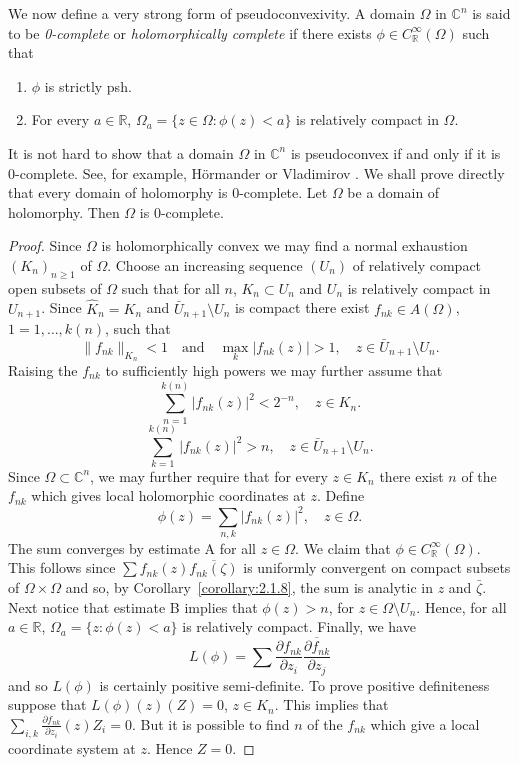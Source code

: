 We now define a very strong form of pseudoconvexivity.
 A domain $\Omega$ in $\mathbb C^n$ is said to be \emph{0-complete} or \emph{holomorphically complete} if there exists $\phi\in C_{\mathbb R}^\infty(\Omega)$ such that
\begin{enumerate}
\item $\phi$ is strictly psh.
\item For every $a\in\mathbb R$, $\Omega_a=\{z\in\Omega:\phi(z)<a\}$ is relatively compact in $\Omega$.
\end{enumerate}
It is not hard to show that a domain $\Omega$ in $\mathbb C^n$ is pseudoconvex if and only if it is 0-complete. See, for example, H\"ormander \cite{bib:I:hormander-l:1} or Vladimirov \cite{bib:I:vladimirov-v-s:1}. We shall prove directly that every domain of holomorphy is 0-complete.
 Let $\Omega$ be a domain of holomorphy. Then $\Omega$ is 0-complete.
\begin{proof}
Since $\Omega$ is holomorphically convex we may find a normal exhaustion $(K_n)_{n\geq1}$ of $\Omega$. Choose an increasing sequence $(U_n)$ of relatively compact open subsets of $\Omega$ such that for all $n$, $K_n\subset U_n$ and $U_n$ is relatively compact in $U_{n+1}$. Since $\widehat K_n=K_n$ and $\bar U_{n+1}\setminus U_n$ is compact there exist $f_{nk}\in A(\Omega)$, $1=1,\ldots,k(n)$, such that
\[\|f_{nk}\|_{K_n}<1\quad\text{and}\quad\max_k|f_{nk}(z)|>1,\quad z\in\bar U_{n+1}\setminus U_n.\]
Raising the $f_{nk}$ to sufficiently high powers we may further assume that
\[\sum_{n=1}^{k(n)}|f_{nk}(z)|^2<2^{-n},\quad z\in K_n.\tag{A}\label{eq:2:a:1}\]
\[\sum_{k=1}^{k(n)}|f_{nk}(z)|^2>n,\quad z\in\bar U_{n+1}\setminus U_n.\tag{B}\label{eq:2:b:1}\]
Since $\Omega\subset\mathbb C^n$, we may further require that for every $z\in K_n$ there exist $n$ of the $f_{nk}$ which gives local holomorphic coordinates at $z$. Define
\[\phi(z)=\sum_{n,k}|f_{nk}(z)|^2,\quad z\in\Omega.\]
The sum converges by estimate A for all $z\in\Omega$. We claim that $\phi\in C_{\mathbb R}^\infty(\Omega)$. This follows since $\sum f_{nk}(z)\overline{f_{nk}(\zeta)}$ is uniformly convergent on compact subsets of $\Omega\times\Omega$ and so, by Corollary~\ref{corollary:2.1.8}, the sum is analytic in $z$ and $\bar\zeta$. Next notice that estimate B implies that $\phi(z)>n$, for $z\in\Omega\setminus U_n$. Hence, for all $a\in\mathbb R$, $\Omega_a=\{z:\phi(z)<a\}$ is relatively compact. Finally, we have
\[L(\phi)=\sum\frac{\partial f_{nk}}{\partial z_i}\overline{\frac{\partial f_{nk}}{\partial z_j}}\]
and so $L(\phi)$ is certainly positive semi-definite. To prove positive definiteness suppose that $L(\phi)(z)(Z)=0$, $z\in K_n$. This implies that $\sum_{i,k}\frac{\partial f_{nk}}{\partial z_i}(z)Z_i=0$. But it is possible to find $n$ of the $f_{nk}$ which give a local coordinate system at $z$. Hence $Z=0$.
\end{proof}
